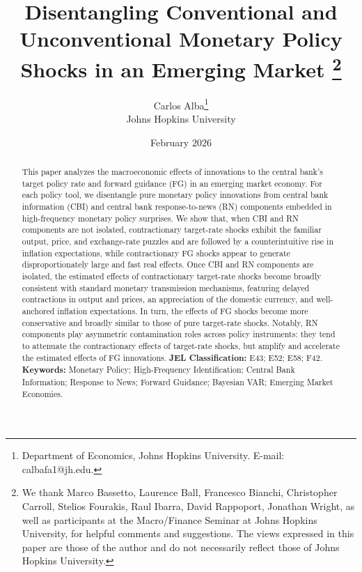 \documentclass[12pt, reqno]{article}
\begin{document}
\title{\vspace{-3.5cm}Disentangling Conventional and Unconventional Monetary Policy Shocks in an Emerging Market \footnote{We thank Marco Bassetto, Laurence Ball, Francesco Bianchi, Christopher Carroll, Stelios Fourakis, Raul Ibarra, David Rappoport, Jonathan Wright, as well as participants at the Macro/Finance Seminar at Johns Hopkins University, for helpful comments and suggestions. The views expressed in this paper are those of the author and do not necessarily reflect those of Johns Hopkins University.}}

\author{{{Carlos Alba}\footnote{Department of Economics, Johns Hopkins University. E-mail: calbafa1@jh.edu.}}
\\
{\small{Johns Hopkins University}}}



\date{February $2026$} \maketitle
\vspace{-1cm}

\begin{abstract}
\noindent
This paper analyzes the macroeconomic effects of innovations to the central bank’s target policy rate and forward guidance (FG) in an emerging market economy. For each policy tool, we disentangle pure monetary policy innovations from central bank information (CBI) and central bank response-to-news (RN) components embedded in high-frequency monetary policy surprises. We show that, when CBI and RN components are not isolated, contractionary target-rate shocks exhibit the familiar output, price, and exchange-rate puzzles and are followed by a counterintuitive rise in inflation expectations, while contractionary FG shocks appear to generate disproportionately large and fast real effects. Once CBI and RN components are isolated, the estimated effects of contractionary target-rate shocks become broadly consistent with standard monetary transmission mechanisms, featuring delayed contractions in output and prices, an appreciation of the domestic currency, and well-anchored inflation expectations. In turn, the effects of FG shocks become more conservative and broadly similar to those of pure target-rate shocks. Notably, RN components play asymmetric contamination roles across policy instruments: they tend to attenuate the contractionary effects of target-rate shocks, but amplify and accelerate the estimated effects of FG innovations.
\newline
\noindent \textbf{JEL Classification:} E43; E52; E58; F42.
\newline
\noindent \textbf{Keywords:} Monetary Policy; High-Frequency Identification; Central Bank Information; Response to News; Forward Guidance; Bayesian VAR; Emerging Market Economies.
\end{abstract}
\end{document}
